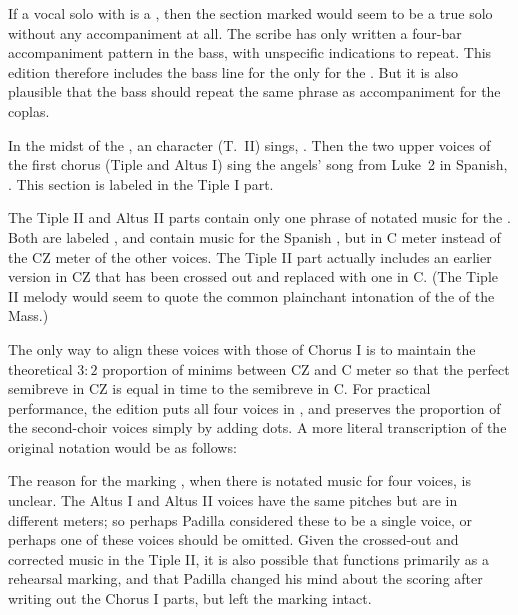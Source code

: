 If a vocal solo with  is a , then the section marked  would seem to be a true solo without any accompaniment at all.
The scribe has only written a four-bar accompaniment pattern in the bass, with unspecific indications to repeat.
This edition therefore includes the bass line for the  only for the .
But it is also plausible that the bass should repeat the same phrase as accompaniment for the coplas.


In the midst of the , an  character (T.~II) sings, .
Then the two upper voices of the first chorus (Tiple and Altus I) sing the angels' song from Luke~2 in Spanish, .
This section is labeled  in the Tiple I part.

The Tiple II and Altus II parts contain only one phrase of notated music for the .
Both are labeled , and contain music for the Spanish , but in C meter instead of the CZ meter of the other voices.
The Tiple II part actually includes an earlier version in CZ that has been crossed out and replaced with one in C.
(The Tiple II melody would seem to quote the common plainchant intonation of the  of the Mass.)

The only way to align these voices with those of Chorus I is to maintain the theoretical $3:2$ proportion of minims between CZ and C meter so that the perfect semibreve in CZ is equal in time to the semibreve in C.
For practical performance, the edition puts all four voices in , and preserves the proportion of the second-choir voices simply by adding dots.
A more literal transcription of the original notation would be as follows:


The reason for the marking , when there is notated music for four voices, is unclear.
The Altus I and Altus II voices have the same pitches but are in different meters; so perhaps Padilla considered these to be a single voice, or perhaps one of these voices should be omitted.
Given the crossed-out and corrected music in the Tiple II, it is also possible that  functions primarily as a rehearsal marking, and that Padilla changed his mind about the scoring after writing out the Chorus I parts, but left the marking intact.


